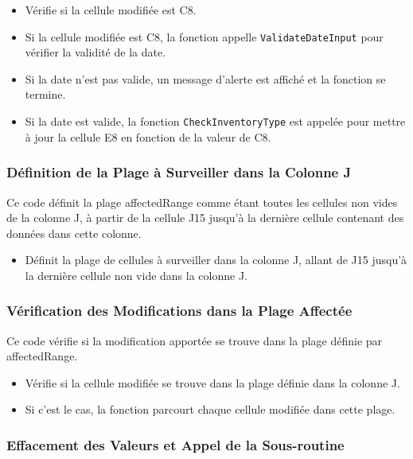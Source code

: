 \documentclass[a4paper, oneside, 12pt, final]{extreport}
\begin{document}
\begin{itemize}
    \item Vérifie si la cellule modifiée est C8.
    \item Si la cellule modifiée est C8, la fonction appelle \texttt{ValidateDateInput} pour vérifier la validité de la date.
    \item Si la date n'est pas valide, un message d'alerte est affiché et la fonction se termine.
    \item Si la date est valide, la fonction \texttt{CheckInventoryType} est appelée pour mettre à jour la cellule E8 en fonction de la valeur de C8.
\end{itemize}

\subsubsection{Définition de la Plage à Surveiller dans la Colonne J}

Ce code définit la plage affectedRange comme étant toutes les cellules non vides de la colonne J, à partir de la cellule J15 jusqu'à la dernière cellule contenant des données dans cette colonne.

\begin{itemize}
    \item Définit la plage de cellules à surveiller dans la colonne J, allant de J15 jusqu'à la dernière cellule non vide dans la colonne J.
\end{itemize}

\subsubsection{Vérification des Modifications dans la Plage Affectée}

Ce code vérifie si la modification apportée se trouve dans la plage définie par affectedRange.

\begin{itemize}
    \item Vérifie si la cellule modifiée se trouve dans la plage définie dans la colonne J.
    \item Si c'est le cas, la fonction parcourt chaque cellule modifiée dans cette plage.
\end{itemize}

\subsubsection{Effacement des Valeurs et Appel de la Sous-routine}
\end{document}
